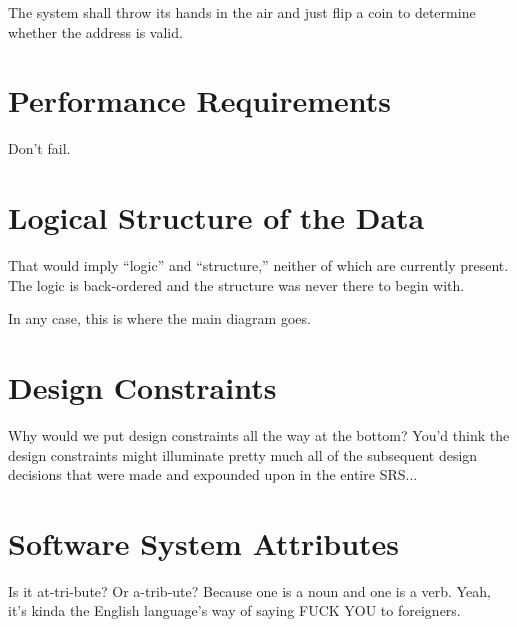 \documentclass{scrreprt}
\begin{document}
The system shall throw its hands in the air and just flip a coin to determine 
whether the address is valid.

\section{Performance Requirements}

Don't fail.

\section{Logical Structure of the Data}

That would imply ``logic'' and ``structure,'' neither of which are 
currently present. The logic is back-ordered and the structure was 
never there to begin with.

In any case, this is where the main diagram goes.

\section{Design Constraints}

Why would we put design constraints all the way at the bottom? You'd think 
the design constraints might illuminate pretty much all of the subsequent 
design decisions that were made and expounded upon in the entire SRS...

\section{Software System Attributes}

Is it at-tri-bute? Or a-trib-ute? Because one is a noun and one is a verb. 
Yeah, it's kinda the English language's way of saying FUCK YOU to foreigners.

\end{document}
